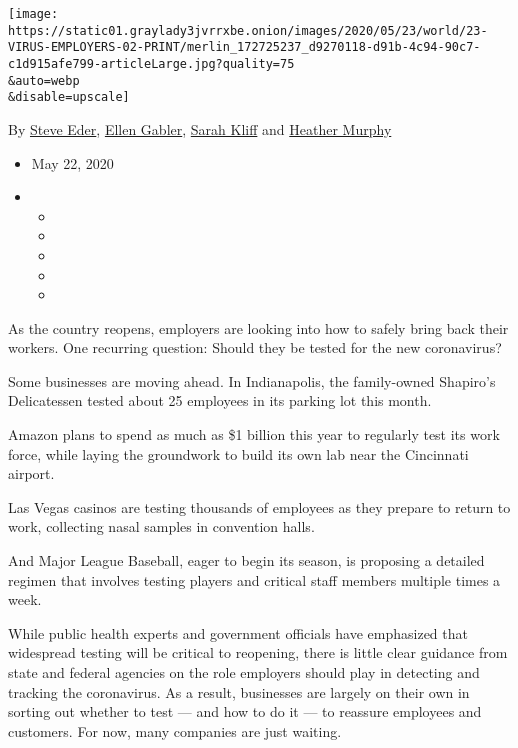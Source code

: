 \texttt{[image: https://static01.graylady3jvrrxbe.onion/images/2020/05/23/world/23-VIRUS-EMPLOYERS-02-PRINT/merlin\_172725237\_d9270118-d91b-4c94-90c7-c1d915afe799-articleLarge.jpg?quality=75\\\&auto=webp\\\&disable=upscale]}

By \href{https://www.nytimes3xbfgragh.onion/by/steve-eder}{Steve Eder},
\href{https://nytimes3xbfgragh.onion/by/ellen-gabler/}{Ellen Gabler},
\href{https://www.nytimes3xbfgragh.onion/by/sarah-kliff}{Sarah Kliff}
and \href{https://www.nytimes3xbfgragh.onion/by/heather-murphy}{Heather
Murphy}

\begin{itemize}
\item
  May 22, 2020
\item
  \begin{itemize}
  \item
  \item
  \item
  \item
  \item
  \end{itemize}
\end{itemize}

As the country reopens, employers are looking into how to safely bring
back their workers. One recurring question: Should they be tested for
the new coronavirus?

Some businesses are moving ahead. In Indianapolis, the family-owned
Shapiro's Delicatessen tested about 25 employees in its parking lot this
month.

Amazon plans to spend as much as \$1 billion this year to regularly test
its work force, while laying the groundwork to build its own lab near
the Cincinnati airport.

Las Vegas casinos are testing thousands of employees as they prepare to
return to work, collecting nasal samples in convention halls.

And Major League Baseball, eager to begin its season, is proposing a
detailed regimen that involves testing players and critical staff
members multiple times a week.

While public health experts and government officials have emphasized
that widespread testing will be critical to reopening, there is little
clear guidance from state and federal agencies on the role employers
should play in detecting and tracking the coronavirus. As a result,
businesses are largely on their own in sorting out whether to test ---
and how to do it --- to reassure employees and customers. For now, many
companies are just waiting.

